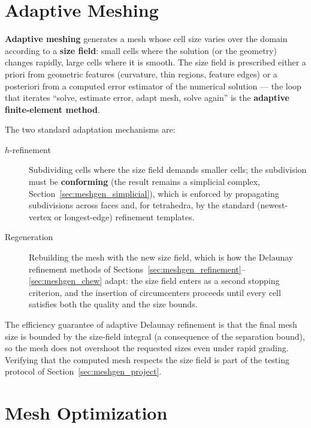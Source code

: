 
\section{Adaptive Meshing}
\label{sec:meshgen_adaptive}

\textbf{Adaptive meshing} generates a mesh whose
cell size varies over the domain according to a \textbf{size field}: small
cells where the solution (or the geometry) changes rapidly, large cells
where it is smooth. The size field is prescribed either a priori from
geometric features (curvature, thin regions, feature edges) or a posteriori
from a computed error estimator of the numerical solution --- the
loop that iterates ``solve, estimate error, adapt mesh, solve again''
is the \textbf{adaptive finite-element method}.

The two standard adaptation mechanisms are:
\begin{description}
  \item[$h$-refinement] Subdividing cells where the size field demands
    smaller cells; the subdivision must be \textbf{conforming} (the result
    remains a simplicial complex, Section~\ref{sec:meshgen_simplicial}),
    which is enforced by propagating subdivisions across faces and, for
    tetrahedra, by the standard (newest-vertex or longest-edge) refinement
    templates.
  \item[Regeneration] Rebuilding the mesh with the new size field, which is
    how the Delaunay refinement methods of
    Sections~\ref{sec:meshgen_refinement}--\ref{sec:meshgen_chew} adapt:
    the size field enters as a second stopping criterion, and the insertion
    of circumcenters proceeds until every cell satisfies both the quality
    and the size bounds.
\end{description}

The efficiency guarantee of adaptive Delaunay refinement is that the final
mesh size is bounded by the size-field integral (a consequence of the
separation bound), so the mesh does not overshoot the requested sizes even
under rapid grading. Verifying that the computed mesh respects the size
field is part of the testing protocol of Section~\ref{sec:meshgen_project}.


\section{Mesh Optimization}
\label{sec:meshgen_optimization}

